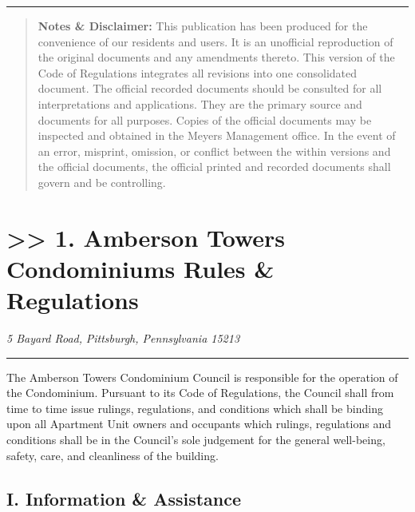 \documentclass[
  14pt,
]{book}
\begin{document}
\begin{center}\rule{0.5\linewidth}{0.5pt}\end{center}

\begin{quote}
\textbf{Notes \& Disclaimer:} This publication has been produced for the convenience of our residents and users. It is an unofficial reproduction of the original documents and any amendments thereto. This version of the Code of Regulations integrates all revisions into one consolidated document. The official recorded documents should be consulted for all interpretations and applications. They are the primary source and documents for all purposes. Copies of the official documents may be inspected and obtained in the Meyers Management office. In the event of an error, misprint, omission, or conflict between the within versions and the official documents, the official printed and recorded documents shall govern and be controlling.
\end{quote}

\hypertarget{amberson-towers-condominiums-rules-regulations}{%
\chapter*{\texorpdfstring{\textgreater\textgreater{} 1. Amberson Towers Condominiums Rules \& Regulations}{\textgreater\textgreater{} 1. Amberson Towers Condominiums   Rules \& Regulations}}\label{amberson-towers-condominiums-rules-regulations}}

\emph{5 Bayard Road,} \emph{Pittsburgh, Pennsylvania 15213}

\begin{center}\rule{0.5\linewidth}{0.5pt}\end{center}

The Amberson Towers Condominium Council is responsible for the operation of the Condominium. Pursuant to its Code of Regulations, the Council shall from time to time issue rulings, regulations, and conditions which shall be binding upon all Apartment Unit owners and occupants which rulings, regulations and conditions shall be in the Council's sole judgement for the general well-being, safety, care, and cleanliness of the building.

\hypertarget{i.-information-assistance}{%
\section*{I. Information \& Assistance}\label{i.-information-assistance}}
\end{document}
